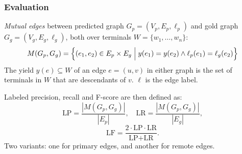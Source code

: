 \documentclass[t]{beamer}
\begin{document}
\begin{frame}
\frametitle{Evaluation}
\textit{Mutual edges} between predicted graph $G_p=(V_p,E_p,\ell_p)$
and gold graph $G_g=(V_g,E_g,\ell_g)$,
both over terminals $W = \{w_1,\ldots,w_n\}$:
\[
M(G_p,G_g) =
    \Bigl\{(e_1,e_2) \in E_p \times E_g \;\Big|\;
    y(e_1) = y(e_2) \wedge \ell_p(e_1)=\ell_g(e_2)\Bigr\}
\]
The yield $y(e) \subseteq W$ of an edge $e=(u,v)$ in either graph
is the set of terminals in $W$ that are descendants of $v$. \hfill
$\ell$ is the edge label.

\vfill
Labeled precision, recall and F-score are then defined as:
\[
\text{LP} = \frac{|M(G_p,G_g)|}{|E_p|},\quad
\text{LR} = \frac{|M(G_p,G_g)|}{|E_g|},
\]
\[
\text{LF} = \frac{2 \cdot \text{LP} \cdot \text{LR}}{\text{LP} + \text{LR}}.
\]
Two variants:
one for primary edges, and another for remote edges.
\end{frame}
\end{document}
